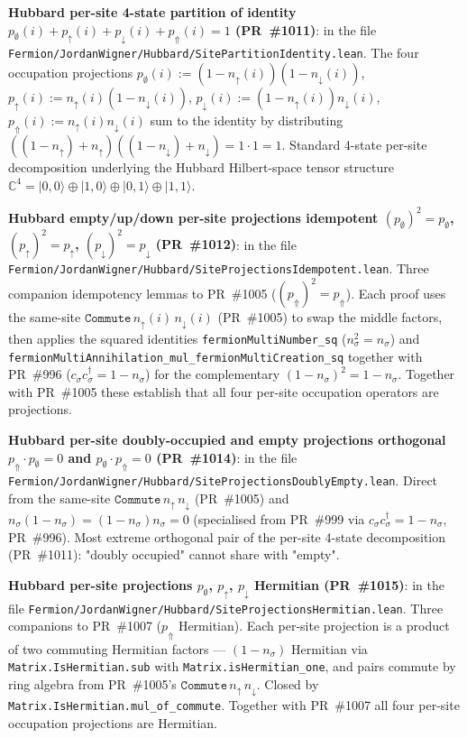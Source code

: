 \documentclass[a4paper,11pt]{article}
\begin{document}
\textbf{Hubbard per-site 4-state partition of identity
$p_\emptyset(i) + p_\uparrow(i) + p_\downarrow(i) +
p_\Uparrow(i) = 1$ (PR~\#1011)}: in the file
\texttt{Fermion/JordanWigner/Hubbard/SitePartitionIdentity.lean}.
The four occupation projections
$p_\emptyset(i) := (1 - n_\uparrow(i))(1 - n_\downarrow(i))$,
$p_\uparrow(i) := n_\uparrow(i)(1 - n_\downarrow(i))$,
$p_\downarrow(i) := (1 - n_\uparrow(i)) n_\downarrow(i)$,
$p_\Uparrow(i) := n_\uparrow(i) n_\downarrow(i)$
sum to the identity by distributing
$((1 - n_\uparrow) + n_\uparrow)((1 - n_\downarrow) +
n_\downarrow) = 1\cdot 1 = 1$. Standard 4-state per-site
decomposition underlying the Hubbard Hilbert-space tensor
structure $\mathbb{C}^4 = |0,0\rangle \oplus |1,0\rangle
\oplus |0,1\rangle \oplus |1,1\rangle$.

\textbf{Hubbard empty/up/down per-site projections idempotent
$(p_\emptyset)^2 = p_\emptyset$, $(p_\uparrow)^2 = p_\uparrow$,
$(p_\downarrow)^2 = p_\downarrow$ (PR~\#1012)}: in the file
\texttt{Fermion/JordanWigner/Hubbard/SiteProjectionsIdempotent.lean}.
Three companion idempotency lemmas to PR~\#1005 ($(p_\Uparrow)^2
= p_\Uparrow$). Each proof uses the same-site $\texttt{Commute}\,
n_\uparrow(i)\,n_\downarrow(i)$ (PR~\#1005) to swap the middle
factors, then applies the squared identities
\texttt{fermionMultiNumber\_sq} ($n_\sigma^2 = n_\sigma$) and
\texttt{fermionMultiAnnihilation\_mul\_fermionMultiCreation\_sq}
together with PR~\#996 ($c_\sigma c_\sigma^\dagger = 1 -
n_\sigma$) for the complementary $(1 - n_\sigma)^2 = 1 -
n_\sigma$. Together with PR~\#1005 these establish that all
four per-site occupation operators are projections.

\textbf{Hubbard per-site doubly-occupied and empty projections
orthogonal $p_\Uparrow\cdot p_\emptyset = 0$ and
$p_\emptyset\cdot p_\Uparrow = 0$ (PR~\#1014)}: in the file
\texttt{Fermion/JordanWigner/Hubbard/SiteProjectionsDoublyEmpty.lean}.
Direct from the same-site $\texttt{Commute}\,n_\uparrow\,
n_\downarrow$ (PR~\#1005) and $n_\sigma(1 - n_\sigma) =
(1 - n_\sigma)n_\sigma = 0$ (specialised from PR~\#999 via
$c_\sigma c_\sigma^\dagger = 1 - n_\sigma$, PR~\#996). Most
extreme orthogonal pair of the per-site 4-state decomposition
(PR~\#1011): "doubly occupied" cannot share with "empty".

\textbf{Hubbard per-site projections $p_\emptyset$,
$p_\uparrow$, $p_\downarrow$ Hermitian (PR~\#1015)}: in the
file
\texttt{Fermion/JordanWigner/Hubbard/SiteProjectionsHermitian.lean}.
Three companions to PR~\#1007 ($p_\Uparrow$ Hermitian). Each
per-site projection is a product of two commuting Hermitian
factors --- $(1 - n_\sigma)$ Hermitian via
\texttt{Matrix.IsHermitian.sub} with
\texttt{Matrix.isHermitian\_one}, and pairs commute by ring
algebra from PR~\#1005's $\texttt{Commute}\,n_\uparrow\,
n_\downarrow$. Closed by
\texttt{Matrix.IsHermitian.mul\_of\_commute}. Together with
PR~\#1007 all four per-site occupation projections are
Hermitian.
\end{document}
